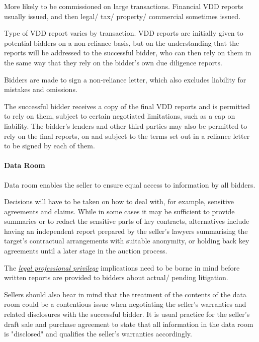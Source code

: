 \documentclass[
]{article}
\begin{document}
More likely to be commissioned on large transactions. Financial VDD
reports usually issued, and then legal/ tax/ property/ commercial
sometimes issued.

Type of VDD report varies by transaction. VDD reports are initially
given to potential bidders on a non-reliance basis, but on the
understanding that the reports will be addressed to the successful
bidder, who can then rely on them in the same way that they rely on the
bidder's own due diligence reports.

Bidders are made to sign a non-reliance letter, which also excludes
liability for mistakes and omissions.

The successful bidder receives a copy of the final VDD reports and is
permitted to rely on them, subject to certain negotiated limitations,
such as a cap on liability. The bidder's lenders and other third parties
may also be permitted to rely on the final reports, on and subject to
the terms set out in a reliance letter to be signed by each of them.

\hypertarget{data-room}{%
\paragraph{Data Room}\label{data-room}}

Data room enables the seller to ensure equal access to information by
all bidders.

Decisions will have to be taken on how to deal with, for example,
sensitive agreements and claims. While in some cases it may be
sufficient to provide summaries or to redact the sensitive parts of key
contracts, alternatives include having an independent report prepared by
the seller's lawyers summarising the target's contractual arrangements
with suitable anonymity, or holding back key agreements until a later
stage in the auction process.

The
\emph{\href{https://uk.practicallaw.thomsonreuters.com/4-107-6756?originationContext=document\&transitionType=DocumentItem\&contextData=(sc.Default)\&ppcid=e6c4099f36904665b8e4b53211f9bb58}{legal
professional privilege}} implications need to be borne in mind before
written reports are provided to bidders about actual/ pending
litigation.

Sellers should also bear in mind that the treatment of the contents of
the data room could be a contentious issue when negotiating the seller's
warranties and related disclosures with the successful bidder. It is
usual practice for the seller's draft sale and purchase agreement to
state that all information in the data room is "disclosed" and qualifies
the seller's warranties accordingly.
\end{document}
